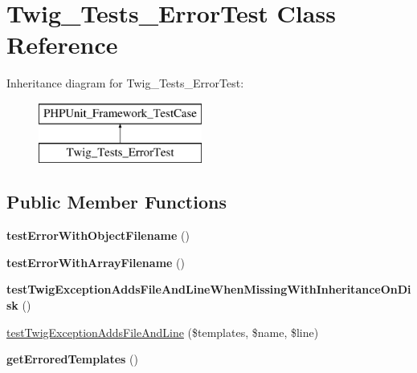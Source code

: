 \hypertarget{classTwig__Tests__ErrorTest}{}\section{Twig\+\_\+\+Tests\+\_\+\+Error\+Test Class Reference}
\label{classTwig__Tests__ErrorTest}
Inheritance diagram for Twig\+\_\+\+Tests\+\_\+\+Error\+Test\+:\begin{figure}[H]
\begin{center}
\leavevmode
\includegraphics[height=2.000000cm]{classTwig__Tests__ErrorTest}
\end{center}
\end{figure}
\subsection*{Public Member Functions}
\begin{DoxyCompactItemize}
\item 
{\bfseries test\+Error\+With\+Object\+Filename} ()\hypertarget{classTwig__Tests__ErrorTest_ae6f8472a1e5e72f604eefab4c4d0d3b0}{}\label{classTwig__Tests__ErrorTest_ae6f8472a1e5e72f604eefab4c4d0d3b0}

\item 
{\bfseries test\+Error\+With\+Array\+Filename} ()\hypertarget{classTwig__Tests__ErrorTest_a9332e904c01b79a351b6187c19334d07}{}\label{classTwig__Tests__ErrorTest_a9332e904c01b79a351b6187c19334d07}

\item 
{\bfseries test\+Twig\+Exception\+Adds\+File\+And\+Line\+When\+Missing\+With\+Inheritance\+On\+Disk} ()\hypertarget{classTwig__Tests__ErrorTest_a0fc3ec9200f837359e44535c6e830b2d}{}\label{classTwig__Tests__ErrorTest_a0fc3ec9200f837359e44535c6e830b2d}

\item 
\hyperlink{classTwig__Tests__ErrorTest_a47ff8cc8e5da96d85da616d5303c8020}{test\+Twig\+Exception\+Adds\+File\+And\+Line} (\$templates, \$name, \$line)
\item 
{\bfseries get\+Errored\+Templates} ()\hypertarget{classTwig__Tests__ErrorTest_ad7b408d583dd8524a5fb6ca59ea201d8}{}\label{classTwig__Tests__ErrorTest_ad7b408d583dd8524a5fb6ca59ea201d8}

\end{DoxyCompactItemize}


